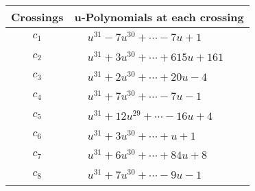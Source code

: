 \documentclass[1p]{elsarticle_modified}
\theoremstyle{definition}
\begin{document}
\begin{tabular}{m{50pt}|m{274pt}}
Crossings & \hspace{64pt}u-Polynomials at each crossing \\
\hline $$\begin{aligned}c_{1}\end{aligned}$$&$\begin{aligned}
&u^{31}-7 u^{30}+\cdots-7 u+1
\end{aligned}$\\
\hline $$\begin{aligned}c_{2}\end{aligned}$$&$\begin{aligned}
&u^{31}+3 u^{30}+\cdots+615 u+161
\end{aligned}$\\
\hline $$\begin{aligned}c_{3}\end{aligned}$$&$\begin{aligned}
&u^{31}+2 u^{30}+\cdots+20 u-4
\end{aligned}$\\
\hline $$\begin{aligned}c_{4}\end{aligned}$$&$\begin{aligned}
&u^{31}+7 u^{30}+\cdots-7 u-1
\end{aligned}$\\
\hline $$\begin{aligned}c_{5}\end{aligned}$$&$\begin{aligned}
&u^{31}+12 u^{29}+\cdots-16 u+4
\end{aligned}$\\
\hline $$\begin{aligned}c_{6}\end{aligned}$$&$\begin{aligned}
&u^{31}+3 u^{30}+\cdots+u+1
\end{aligned}$\\
\hline $$\begin{aligned}c_{7}\end{aligned}$$&$\begin{aligned}
&u^{31}+6 u^{30}+\cdots+84 u+8
\end{aligned}$\\
\hline $$\begin{aligned}c_{8}\end{aligned}$$&$\begin{aligned}
&u^{31}+7 u^{30}+\cdots-9 u-1
\end{aligned}$\\

\end{tabular}
\end{document}
